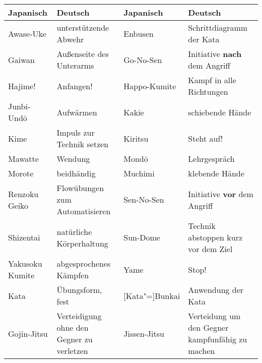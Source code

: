 	{\footnotesize \begin{tabularx}{\linewidth}{lXlX}
	Japanisch	& Deutsch	& Japanisch&Deutsch\\
	\midrule
	Awase-Uke&	unterstützende Abwehr	&	Enbusen	&	Schrittdiagramm der Kata\\
	Gaiwan	& Außenseite des Unterarms	&	Go-No-Sen	&	Initiative \textbf{nach} dem Angriff\\
	Hajime!&	Anfangen!	&	Happo-Kumite	& Kampf in alle Richtungen\\
	Junbi-Und\={o}	& Aufwärmen	&	Kakie	& schiebende Hände\\
	Kime	&	Impuls zur Technik setzen	& Kiritsu & Steht auf!\\
	Mawatte	& Wendung&	Mond\={o}& Lehrgespräch\\
	Morote	& beidhändig	& Muchimi & klebende Hände\\
	Renzoku Geiko	& Flowübungen zum Automatisieren & Sen-No-Sen & Initiative \textbf{vor} dem Angriff\\
	Shizentai	& natürliche Körperhaltung&Sun-Dome & Technik abstoppen  kurz vor dem Ziel\\
	Yakusoku Kumite & abgesprochenes Kämpfen & Yame	& Stop!\\
	Kata& Übungsform, fest & [Kata"=]Bunkai & Anwendung der Kata \\
	Gojin-Jitsu&Verteidigung ohne den Gegner zu verletzen&Jissen-Jitsu&Verteidung um den Gegner kampfunfähig zu machen \\
	\end{tabularx}}